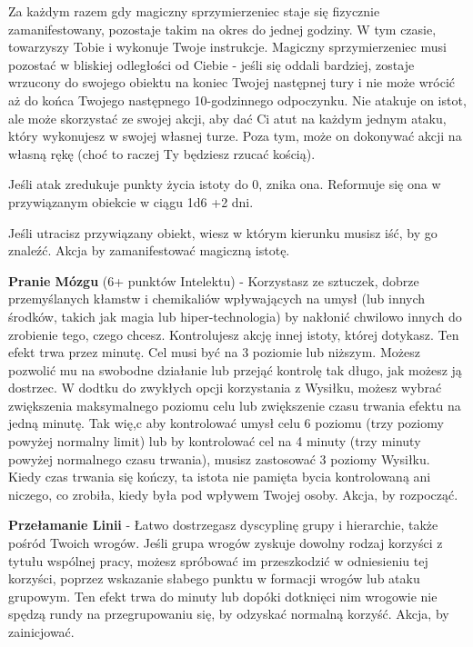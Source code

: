 Za każdym razem gdy magiczny sprzymierzeniec staje się fizycznie zamanifestowany, pozostaje takim na okres do jednej godziny. W tym czasie, towarzyszy Tobie i wykonuje Twoje instrukcje. Magiczny sprzymierzeniec musi pozostać w bliskiej odległości od Ciebie - jeśli się oddali bardziej, zostaje wrzucony do swojego obiektu na koniec Twojej następnej tury i nie może wrócić aż do końca Twojego następnego 10-godzinnego odpoczynku. Nie atakuje on istot, ale może skorzystać ze swojej akcji, aby dać Ci atut na każdym jednym ataku, który wykonujesz w swojej własnej turze. Poza tym, może on dokonywać akcji na własną rękę (choć to raczej Ty będziesz rzucać kością).

Jeśli atak zredukuje punkty życia istoty do 0, znika ona. Reformuje się ona w przywiązanym obiekcie w ciągu 1d6 +2 dni. 

Jeśli utracisz przywiązany obiekt, wiesz w którym kierunku musisz iść, by go znaleźć. Akcja by zamanifestować magiczną istotę. 

\textbf{Pranie Mózgu}\label{sec:Pranie Mózgu} (6+ punktów Intelektu) - Korzystasz ze sztuczek, dobrze przemyślanych kłamstw i chemikaliów wpływających na umysł (lub innych środków, takich jak magia lub hiper-technologia) by nakłonić chwilowo innych do zrobienie tego, czego chcesz. Kontrolujesz akcję innej istoty, której dotykasz. Ten efekt trwa przez minutę. Cel musi być na 3 poziomie lub niższym. Możesz pozwolić mu na swobodne działanie lub przejąć kontrolę tak długo, jak możesz ją dostrzec. W dodtku do zwykłych opcji korzystania z Wysiłku, możesz wybrać zwiększenia maksymalnego poziomu celu lub zwiększenie czasu trwania efektu na jedną minutę. Tak wię,c aby kontrolować umysł celu 6 poziomu (trzy poziomy powyżej normalny limit) lub by kontrolować cel na 4 minuty (trzy minuty powyżej normalnego czasu trwania), musisz zastosować 3 poziomy Wysiłku. Kiedy czas trwania się kończy, ta istota nie pamięta bycia kontrolowaną ani niczego, co zrobiła, kiedy była pod wpływem Twojej osoby. Akcja, by rozpocząć.

\textbf{Przełamanie Linii}\label{sec:Przełamanie Linii} - Łatwo dostrzegasz dyscyplinę grupy i hierarchie, także pośród Twoich wrogów. Jeśli grupa wrogów zyskuje dowolny rodzaj korzyści z tytułu wspólnej pracy, możesz spróbować im przeszkodzić w odniesieniu tej korzyści, poprzez wskazanie słabego punktu w formacji wrogów lub ataku grupowym. Ten efekt trwa do minuty lub dopóki dotknięci nim wrogowie nie spędzą rundy na przegrupowaniu się, by odzyskać normalną korzyść. Akcja, by zainicjować. 

